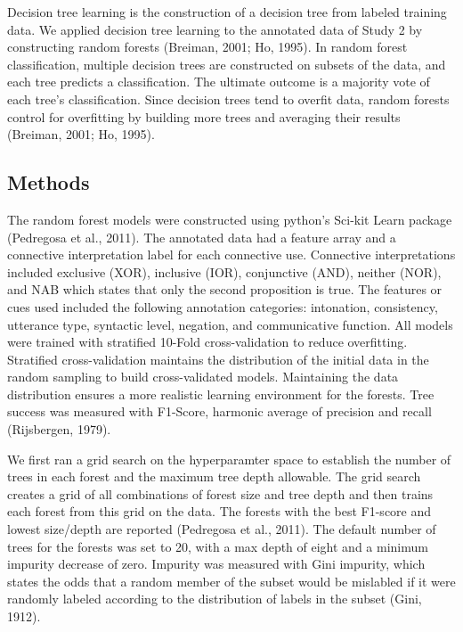 \documentclass[
  english,
  ,man,floatsintext]{apa6}
\begin{document}
Decision tree learning is the construction of a decision tree from labeled training data. We applied decision tree learning to the annotated data of Study 2 by constructing random forests (Breiman, 2001; Ho, 1995). In random forest classification, multiple decision trees are constructed on subsets of the data, and each tree predicts a classification. The ultimate outcome is a majority vote of each tree's classification. Since decision trees tend to overfit data, random forests control for overfitting by building more trees and averaging their results (Breiman, 2001; Ho, 1995).

\hypertarget{methods-2}{%
\subsection{Methods}\label{methods-2}}

The random forest models were constructed using python's Sci-kit Learn package (Pedregosa et al., 2011). The annotated data had a feature array and a connective interpretation label for each connective use. Connective interpretations included exclusive (XOR), inclusive (IOR), conjunctive (AND), neither (NOR), and NAB which states that only the second proposition is true. The features or cues used included the following annotation categories: intonation, consistency, utterance type, syntactic level, negation, and communicative function. All models were trained with stratified 10-Fold cross-validation to reduce overfitting. Stratified cross-validation maintains the distribution of the initial data in the random sampling to build cross-validated models. Maintaining the data distribution ensures a more realistic learning environment for the forests. Tree success was measured with F1-Score, harmonic average of precision and recall (Rijsbergen, 1979).

We first ran a grid search on the hyperparamter space to establish the number of trees in each forest and the maximum tree depth allowable. The grid search creates a grid of all combinations of forest size and tree depth and then trains each forest from this grid on the data. The forests with the best F1-score and lowest size/depth are reported (Pedregosa et al., 2011). The default number of trees for the forests was set to 20, with a max depth of eight and a minimum impurity decrease of zero. Impurity was measured with Gini impurity, which states the odds that a random member of the subset would be mislabled if it were randomly labeled according to the distribution of labels in the subset (Gini, 1912).
\end{document}

